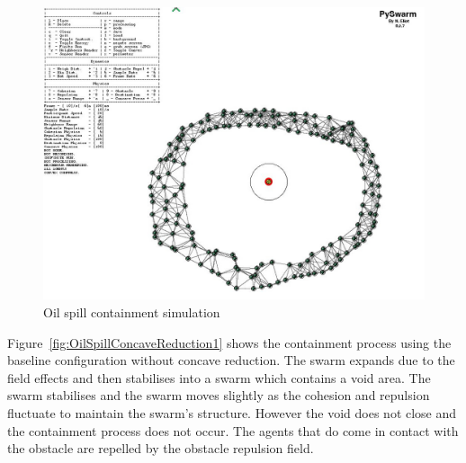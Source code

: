 \begin{figure}[H]
\begin{center}
\includegraphics[width=14cm]{CHAPTER-7/figures/OilSpillSimulator}
\end{center}
\caption{Oil spill containment simulation\label{concave:OilSpillSimulation}}
\end{figure}

Figure~\ref{fig:OilSpillConcaveReduction1} shows the containment process using the baseline configuration without concave reduction. The swarm expands due to the field effects and then stabilises into a swarm which contains a void area. The swarm stabilises and the swarm moves slightly as the cohesion and repulsion fluctuate to maintain the swarm's structure. However the void does not close and the containment process does not occur. The agents that do come in contact with the obstacle are repelled by the obstacle repulsion field.

